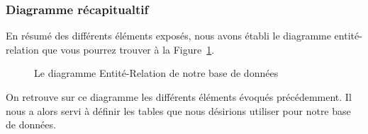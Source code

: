 \subsubsection{Diagramme récapitualtif}
En résumé des différents éléments exposés, nous avons établi le diagramme entité-relation que vous pourrez trouver à la Figure~\ref{fig:diag-er}.

\begin{figure}[ht]
  \centering
  \resizebox{\textwidth}{!}{}
  \caption{Le diagramme Entité-Relation de notre base de données}
  \label{fig:diag-er}
\end{figure}

On retrouve sur ce diagramme les différents éléments évoqués précédemment. Il nous a alors servi à définir les tables que nous désirions utiliser pour notre base de données.


